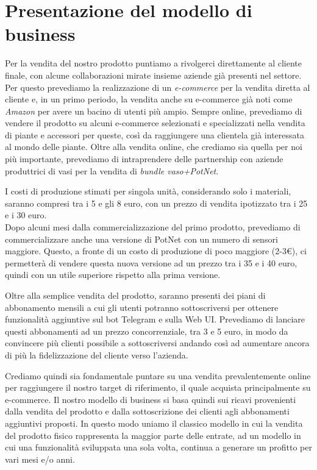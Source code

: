 \section{Presentazione del modello di business}

Per la vendita del nostro prodotto puntiamo a rivolgerci direttamente al cliente finale, con alcune collaborazioni mirate insieme aziende già presenti nel settore. \\Per questo prevediamo la realizzazione di un \textit{e-commerce} per la vendita diretta al cliente e, in un primo periodo, la vendita anche su e-commerce già noti come \textit{Amazon} per avere un bacino di utenti più ampio. Sempre online, prevediamo di vendere il prodotto su alcuni e-commerce selezionati e specializzati nella vendita di piante e accessori per queste, così da raggiungere una clientela già interessata al mondo delle piante. Oltre alla vendita online, che crediamo sia quella per noi più importante, prevediamo di intraprendere delle partnership con aziende produttrici di vasi per la vendita di \textit{bundle vaso+PotNet}.

I costi di produzione stimati per singola unità, considerando solo i materiali, saranno compresi tra i 5 e gli 8 euro, con un prezzo di vendita ipotizzato tra i 25 e i 30 euro. \\Dopo alcuni mesi dalla commercializzazione del primo prodotto, prevediamo di commercializzare anche una versione di PotNet con un numero di sensori maggiore. Questo, a fronte di un costo di produzione di poco maggiore (2-3€), ci permetterà di vendere questa nuova versione ad un prezzo tra i 35 e i 40 euro, quindi con un utile superiore rispetto alla prima versione.

Oltre alla semplice vendita del prodotto, saranno presenti dei piani di abbonamento mensili a cui gli utenti potranno sottoscriversi per ottenere funzionalità aggiuntive sul bot Telegram e sulla Web UI. Prevediamo di lanciare questi abbonamenti ad un prezzo concorrenziale, tra 3 e 5 euro, in modo da convincere più clienti possibile a sottoscriversi andando così ad aumentare ancora di più la fidelizzazione del cliente verso l'azienda.

Crediamo quindi sia fondamentale puntare su una vendita prevalentemente online per raggiungere il nostro target di riferimento, il quale acquista principalmente su e-commerce.
Il nostro modello di business si basa quindi sui ricavi provenienti dalla vendita del prodotto e dalla sottoscrizione dei clienti agli abbonamenti aggiuntivi proposti. In questo modo uniamo il classico modello in cui la vendita del prodotto fisico rappresenta la maggior parte delle entrate, ad un modello in cui una funzionalità sviluppata una sola volta, continua a generare un profitto per vari mesi e/o anni.

